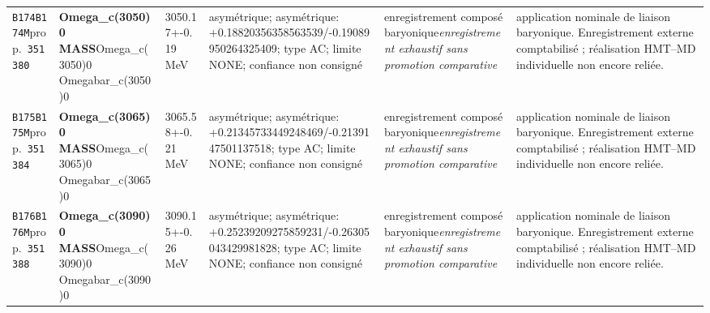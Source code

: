 \begin{landscape}
\begin{longtable}{L{1.85cm}L{4.45cm}L{2.35cm}L{4.05cm}L{3.35cm}L{7.15cm}}
\texttt{B174}\newline \texttt{B174M}\newline prop.\ \texttt{351380} & \textbf{Omega\_\allowbreak{}c(3050)0 MASS}\newline Omega\_\allowbreak{}c(3050)0 \textbar{}\allowbreak{} Omegabar\_\allowbreak{}c(3050)0 & 3050.17+-0.19\,MeV & asymétrique; asymétrique: +0.18820356358563539/-0.19089950264325409; type AC; limite NONE; confiance non consigné & enregistrement composé baryonique\newline \emph{enregistrement exhaustif sans promotion comparative} & application nominale de liaison baryonique. Enregistrement externe comptabilisé ; réalisation HMT--MD individuelle non encore reliée. \\
\texttt{B175}\newline \texttt{B175M}\newline prop.\ \texttt{351384} & \textbf{Omega\_\allowbreak{}c(3065)0 MASS}\newline Omega\_\allowbreak{}c(3065)0 \textbar{}\allowbreak{} Omegabar\_\allowbreak{}c(3065)0 & 3065.58+-0.21\,MeV & asymétrique; asymétrique: +0.21345733449248469/-0.2139147501137518; type AC; limite NONE; confiance non consigné & enregistrement composé baryonique\newline \emph{enregistrement exhaustif sans promotion comparative} & application nominale de liaison baryonique. Enregistrement externe comptabilisé ; réalisation HMT--MD individuelle non encore reliée. \\
\texttt{B176}\newline \texttt{B176M}\newline prop.\ \texttt{351388} & \textbf{Omega\_\allowbreak{}c(3090)0 MASS}\newline Omega\_\allowbreak{}c(3090)0 \textbar{}\allowbreak{} Omegabar\_\allowbreak{}c(3090)0 & 3090.15+-0.26\,MeV & asymétrique; asymétrique: +0.25239209275859231/-0.26305043429981828; type AC; limite NONE; confiance non consigné & enregistrement composé baryonique\newline \emph{enregistrement exhaustif sans promotion comparative} & application nominale de liaison baryonique. Enregistrement externe comptabilisé ; réalisation HMT--MD individuelle non encore reliée. \\

\end{longtable}
\end{landscape}
